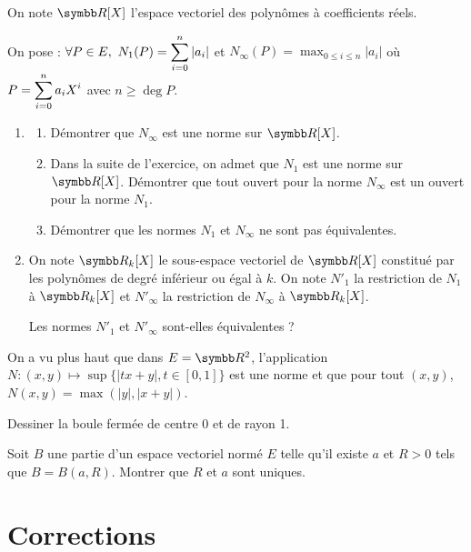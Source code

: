 \begin{exercice}
    On note $\R[X]$ l'espace vectoriel des polynômes à coefficients réels.
    
    On pose : $\displaystyle \forall P \in E,~N_1(P) = \sum_{i=0}^n |a_i|$ et $N_\infty(P) = \max_{0 \leqslant i \leqslant n} |a_i|$ 
    où $\displaystyle P = \sum_{i=0}^n a_i X^i$ avec $n \geqslant \deg P$.
    \begin{enumerate}
        \item 
        \begin{enumerate}
            \item Démontrer que $N_\infty$ est une norme sur $\R[X]$.
            \item Dans la suite de l'exercice, on admet que $N_1$ est une norme sur $\R[X]$. 
                Démontrer que tout ouvert pour la norme $N_\infty$ est un ouvert pour la norme $N_1$.
            \item Démontrer que les normes $N_1$ et $N_\infty$ ne sont pas équivalentes.
        \end{enumerate}
        \item On note $\R_k[X]$ le sous-espace vectoriel de $\R[X]$ constitué par les polynômes de degré inférieur ou égal à $k$. 
            On note $N'_1$ la restriction de $N_1$ à $\R_k[X]$ et $N'_\infty$ la restriction de $N_\infty$ à $\R_k[X]$.

            Les normes $N'_1$ et $N'_\infty$ sont-elles équivalentes ?
    \end{enumerate}
\end{exercice}

\begin{exercice}
    On a vu plus haut que dans $E = \R^2$, l'application $N : (x,y) \mapsto \sup \{ |tx+y|, t \in [0,1] \}$ 
    est une norme et que pour tout $(x,y)$, $N(x,y) = \max(|y|, |x+y|)$.

    Dessiner la boule fermée de centre 0 et de rayon 1.
\end{exercice}

\begin{exercice}
    Soit $B$ une partie d'un espace vectoriel normé $E$ telle qu'il existe $a$ et $R > 0$ tels que $B = B(a,R)$. 
    Montrer que $R$ et $a$ sont uniques.
\end{exercice}

\newpage
\section{Corrections}

